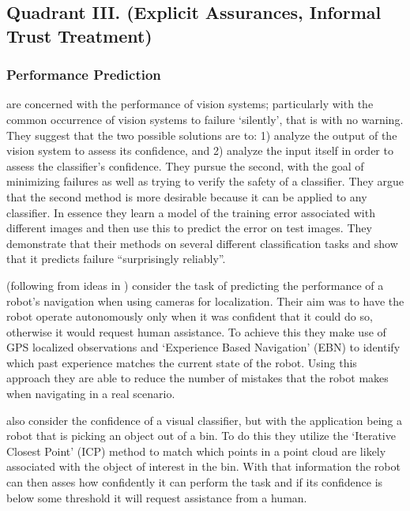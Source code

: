 \subsection{Quadrant III. (Explicit Assurances, Informal Trust Treatment)}\label{sec:q3}
\subsubsection{Performance Prediction}
    \citet{Zhang2014-he} are concerned with the performance of vision systems; particularly with the common occurrence of vision systems to failure `silently', that is with no warning. They suggest that the two possible solutions are to: 1) analyze the output of the vision system to assess its confidence, and 2) analyze the input itself in order to assess the classifier's confidence. They pursue the second, with the goal of minimizing failures as well as trying to verify the safety of a classifier. They argue that the second method is more desirable because it can be applied to any classifier. In essence they learn a model of the training error associated with different images and then use this to predict the error on test images. They demonstrate that their methods on several different classification tasks and show that it predicts failure ``surprisingly reliably''.


    \citet{Gurau2016-hs} (following from ideas in \citet{Churchill2015-ei}) consider the task of predicting the performance of a robot's navigation when using cameras for localization. Their aim was to have the robot operate autonomously only when it was confident that it could do so, otherwise it would request human assistance. To achieve this they make use of GPS localized observations and `Experience Based Navigation' (EBN) to identify which past experience matches the current state of the robot. Using this approach they are able to reduce the number of mistakes that the robot makes when navigating in a real scenario.

    \citet{Kaipa2015-hy} also consider the confidence of a visual classifier, but with the application being a robot that is picking an object out of a bin. To do this they utilize the `Iterative Closest Point' (ICP) method to match which points in a point cloud are likely associated with the object of interest in the bin. With that information the robot can then asses how confidently it can perform the task and if its confidence is below some threshold it will request assistance from a human. 

